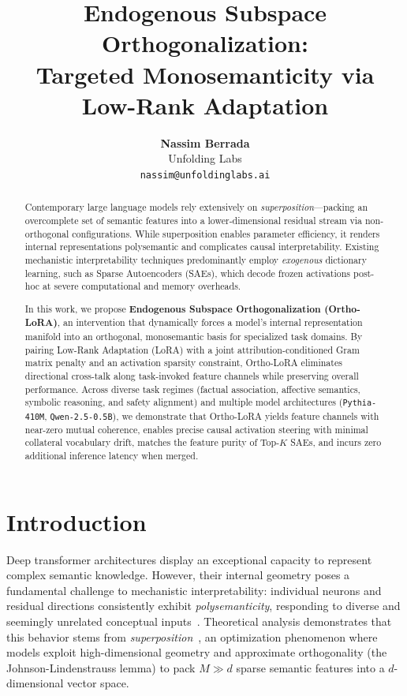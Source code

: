 \documentclass[10pt,twocolumn,letterpaper]{article}
\title{\textbf{Endogenous Subspace Orthogonalization:\\Targeted Monosemanticity via Low-Rank Adaptation}}
\author{
    \textbf{Nassim Berrada} \\
    Unfolding Labs \\
    \texttt{nassim@unfoldinglabs.ai}
}
\date{}
\begin{document}
\maketitle

\begin{abstract}
Contemporary large language models rely extensively on \textit{superposition}---packing an overcomplete set of semantic features into a lower-dimensional residual stream via non-orthogonal configurations. While superposition enables parameter efficiency, it renders internal representations polysemantic and complicates causal interpretability. Existing mechanistic interpretability techniques predominantly employ \textit{exogenous} dictionary learning, such as Sparse Autoencoders (SAEs), which decode frozen activations post-hoc at severe computational and memory overheads. 

In this work, we propose \textbf{Endogenous Subspace Orthogonalization (Ortho-LoRA)}, an intervention that dynamically forces a model's internal representation manifold into an orthogonal, monosemantic basis for specialized task domains. By pairing Low-Rank Adaptation (LoRA) with a joint attribution-conditioned Gram matrix penalty and an activation sparsity constraint, Ortho-LoRA eliminates directional cross-talk along task-invoked feature channels while preserving overall performance. Across diverse task regimes (factual association, affective semantics, symbolic reasoning, and safety alignment) and multiple model architectures (\texttt{Pythia-410M}, \texttt{Qwen-2.5-0.5B}), we demonstrate that Ortho-LoRA yields feature channels with near-zero mutual coherence, enables precise causal activation steering with minimal collateral vocabulary drift, matches the feature purity of Top-$K$ SAEs, and incurs zero additional inference latency when merged.
\end{abstract}

\section{Introduction}
\label{sec:intro}

Deep transformer architectures display an exceptional capacity to represent complex semantic knowledge. However, their internal geometry poses a fundamental challenge to mechanistic interpretability: individual neurons and residual directions consistently exhibit \textit{polysemanticity}, responding to diverse and seemingly unrelated conceptual inputs~\cite{olah2020zoom,elhage2022toy}. Theoretical analysis demonstrates that this behavior stems from \textit{superposition}~\cite{elhage2022toy}, an optimization phenomenon where models exploit high-dimensional geometry and approximate orthogonality (the Johnson-Lindenstrauss lemma) to pack $M \gg d$ sparse semantic features into a $d$-dimensional vector space.
\end{document}

